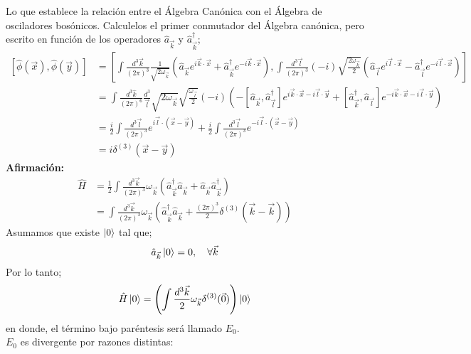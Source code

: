 \documentclass[../main.tex]{subfiles}
\begin{document}
Lo que establece la relación entre el Álgebra Canónica con el Álgebra de osciladores bosónicos.
Calculelos el primer conmutador del Álgebra canónica, pero escrito en función de los operadores $\hat{a}_{\vec{k}}$ y $\hat{a}^\dagger_{\vec{k}}$;
\begin{align*}
  \left[ \hat{\phi}(\vec{x}) , \hat{\phi}(\vec{y}) \right] & = \left[ \int \frac{d^3\vec{k}}{(2\pi)^3} \frac{1}{\sqrt{2\omega_{\vec{k}}}} \left( \hat{a}_{\vec{k}}e^{i\vec{k}\cdot \vec{x}} + \hat{a}_{\vec{k}}^\dagger e^{-i\vec{k}\cdot \vec{x}} \right) 
, \int \frac{d^3\vec{l}}{(2\pi)^3} (-i)\sqrt{\frac{2\omega_{\vec{k}}}{2}}\left( \hat{a}_{\vec{l}}e^{i\vec{l}\cdot \vec{x}} - \hat{a}_{\vec{l}}^\dagger e^{-i\vec{l}\cdot \vec{x}} \right)\right] \\
  & = \int \frac{d^3\hat{k}}{(2\pi)^6} \frac{d^3}\vec{l}{\sqrt{2\omega_{\vec{k}}}} \sqrt{\frac{\omega_{\vec{l}}}{2}} (-i) \left( - \left[ \hat{a}_{\vec{k}} , \hat{a}_{\vec{l}}^\dagger \right] e^{i\vec{k}\cdot \vec{x}- i\vec{l}\cdot \vec{y}} + \left[ \hat{a}^\dagger_{\vec{k}} , \hat{a}_{\vec{l}} \right] e^{-i\vec{k}\cdot\vec{x} - i\vec{l}\cdot \vec{y}} \right) \\
  & = \frac{i}{2} \int \frac{d^3\vec{l}}{(2\pi)^3} e^{i\vec{l}\cdot (\vec{x}-\vec{y})} + \frac{i}{2} \int \frac{d^3\vec{l}}{(2\pi)^3} e^{-i\vec{l}\cdot (\vec{x}-\vec{y})} \\
  & = i\delta^{(3)}(\vec{x}-\vec{y})
\end{align*}
\textbf{Afirmación:}
\begin{align*}
  \hat{H} & = \frac{1}{2} \int \frac{d^3\vec{k}}{(2\pi)^3} \omega_{\vec{k}} \left( \hat{a}^\dagger_{\vec{k}} \hat{a}_{\vec{k}} + \hat{a}_{\vec{k}} \hat{a}^\dagger_{\vec{k}} \right) \\
  & = \int \frac{d^3\vec{k}}{(2\pi)^3} \omega_{\vec{k}} \left( \hat{a}_{\vec{k}}^\dagger \hat{a}_{\vec{k}} + \frac{(2\pi)^3}{2} \delta^{(3)}(\vec{k}-\vec{k}) \right)
\end{align*}
Asumamos que existe $\ket{0}$ tal que;
\begin{equation}
  \hat{a}_{\vec{k}}\ket{0} = 0 ,\quad \forall \vec{k}
 \end{equation}
 Por lo tanto;
 \begin{equation}
   \hat{H} \ket{0} = \left( \int \frac{d^3\vec{k}}{2}  \omega_{\vec{k}} \delta^{(3)}(\vec{0}) \right) \ket{0}
  \end{equation}
  en donde, el término bajo paréntesis será llamado $E_0$. \\
  $E_0$ es divergente por razones distintas:
\end{document}
